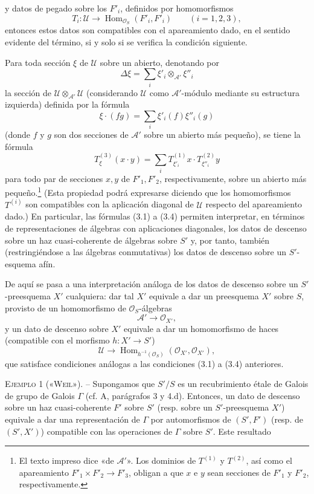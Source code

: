 \documentclass[11pt,twoside,openany]{book}
\numberwithin{equation}{section}
\newcommand{\src}[1]{%
  \phantomsection\hypertarget{src:#1}{}%
  \marginpar{\raggedleft\footnotesize\sffamily #1}%
}
\theoremstyle{plain}
\theoremstyle{definition}
\theoremstyle{remark}
\newcommand{\FgaUnitKey}{frontmatter}
\renewcommand{\src}[1]{%
  \phantomsection\hypertarget{src:\FgaUnitKey:#1}{}%
  \marginpar{\raggedleft\footnotesize\sffamily #1}%
}
\theoremstyle{plain}
\theoremstyle{definition}
\theoremstyle{remark}
\begin{document}
\src{320}
y datos de pegado sobre los $F'_i$, definidos por homomorfismos
\[
  T_i:\mathcal U\longrightarrow
  \operatorname{Hom}_{\mathcal O_S}(F'_i,F'_i)
  \qquad (i=1,2,3),
\]
entonces estos datos son compatibles con el apareamiento dado, en el sentido
evidente del término, si y solo si se verifica la condición siguiente.

Para toda sección $\xi$ de $\mathcal U$ sobre un abierto, denotando por
\[
  \Delta\xi=\sum_i\xi'_i\otimes_{\mathcal A'}\xi''_i
\]
la sección de $\mathcal U\otimes_{\mathcal A'}\mathcal U$ (considerando
$\mathcal U$ como $\mathcal A'$-módulo mediante su estructura izquierda)
definida por la fórmula
\[
  \xi\mathbin{\cdot}(fg)=\sum_i\xi'_i(f)\xi''_i(g)
\]
(donde $f$ y $g$ son dos secciones de $\mathcal A'$ sobre un abierto más
pequeño), se tiene la fórmula
\begin{equation}
  T^{(3)}_\xi(x\mathbin{\cdot}y)
  =\sum_iT^{(1)}_{\xi'_i}x\mathbin{\cdot}T^{(2)}_{\xi''_i}y
  \tag{3.4}
\end{equation}
para todo par de secciones $x,y$ de $F'_1,F'_2$, respectivamente, sobre un
abierto más pequeño.\footnote{El texto impreso dice «de $\mathcal A'$». Los
dominios de $T^{(1)}$ y $T^{(2)}$, así como el apareamiento
$F'_1\times F'_2\longrightarrow F'_3$, obligan a que $x$ e $y$ sean secciones
de $F'_1$ y $F'_2$, respectivamente.} (Esta propiedad podrá expresarse
diciendo que los homomorfismos $T^{(i)}$ son compatibles con la aplicación
diagonal de $\mathcal U$ respecto del apareamiento dado.) En particular, las
fórmulas (3.1) a (3.4) permiten interpretar, en términos de representaciones de
álgebras con aplicaciones diagonales, los datos de descenso sobre un haz
cuasi-coherente de álgebras sobre $S'$ y, por tanto, también (restringiéndose a
las álgebras conmutativas) los datos de descenso sobre un $S'$-esquema afín.

De aquí se pasa a una interpretación análoga de los datos de descenso sobre un
$S'$-preesquema $X'$ cualquiera: dar tal $X'$ equivale a dar un preesquema
$X'$ sobre $S$, provisto de un homomorfismo de $\mathcal O_S$-álgebras
\[
  \mathcal A'\longrightarrow\mathcal O_{X'},
\]
y un dato de descenso sobre $X'$ equivale a dar un homomorfismo de haces
(compatible con el morfismo $h:X'\longrightarrow S'$)
\[
  \mathcal U\longrightarrow
  \operatorname{Hom}_{h^{-1}(\mathcal O_S)}
  (\mathcal O_{X'},\mathcal O_{X'}),
\]
que satisface condiciones análogas a las condiciones (3.1) a (3.4) anteriores.

\textsc{Ejemplo 1 («Weil»).} -- Supongamos que $S'/S$ es un recubrimiento étale
de Galois de grupo de Galois $\Gamma$ (cf. A, parágrafos 3 y 4.d). Entonces, un
dato de descenso sobre un haz cuasi-coherente $F'$ sobre $S'$ (resp. sobre un
$S'$-preesquema $X'$) equivale a dar una representación de $\Gamma$ por
automorfismos de $(S',F')$ (resp. de $(S',X')$) compatible con las operaciones
de $\Gamma$ sobre $S'$. Este resultado
\end{document}
